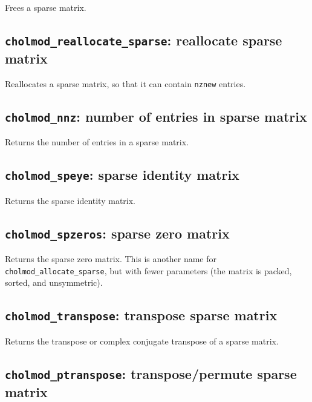 \documentclass[11pt]{article}
\begin{document}

Frees a sparse matrix.

\subsection{{\tt cholmod\_reallocate\_sparse}: reallocate sparse matrix}


Reallocates a sparse matrix, so that it can contain {\tt nznew} entries.

\newpage \subsection{{\tt cholmod\_nnz}: number of entries in sparse matrix}


Returns the number of entries in a sparse matrix.

\subsection{{\tt cholmod\_speye}: sparse identity matrix}


Returns the sparse identity matrix.

\subsection{{\tt cholmod\_spzeros}: sparse zero matrix}


Returns the sparse zero matrix.  This is another name
for {\tt cholmod\_allocate\_sparse}, but with fewer parameters
(the matrix is packed, sorted, and unsymmetric).

\newpage \subsection{{\tt cholmod\_transpose}: transpose sparse matrix}


Returns the transpose or complex conjugate transpose of a sparse matrix.

\subsection{{\tt cholmod\_ptranspose}: transpose/permute sparse matrix}
\end{document}
